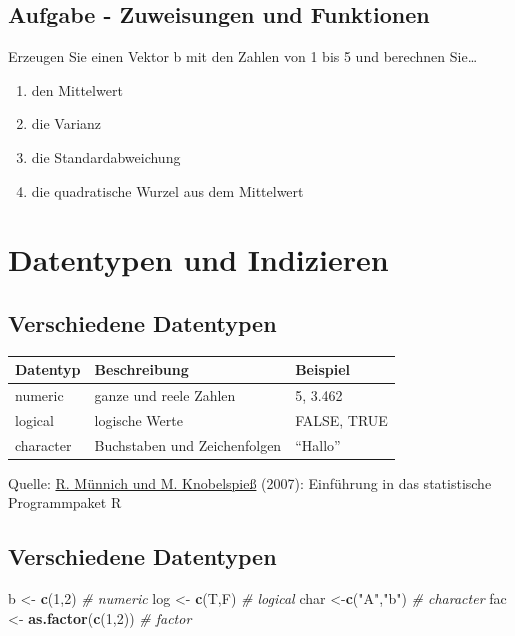 \documentclass[]{article}
\newenvironment{Shaded}{\begin{snugshade}}{\end{snugshade}}
\newcommand{\KeywordTok}[1]{\textcolor[rgb]{0.13,0.29,0.53}{\textbf{{#1}}}}
\newcommand{\DecValTok}[1]{\textcolor[rgb]{0.00,0.00,0.81}{{#1}}}
\newcommand{\StringTok}[1]{\textcolor[rgb]{0.31,0.60,0.02}{{#1}}}
\newcommand{\CommentTok}[1]{\textcolor[rgb]{0.56,0.35,0.01}{\textit{{#1}}}}
\newcommand{\NormalTok}[1]{{#1}}
\begin{document}
\subsection{Aufgabe - Zuweisungen und
Funktionen}\label{aufgabe---zuweisungen-und-funktionen}

Erzeugen Sie einen Vektor b mit den Zahlen von 1 bis 5 und berechnen
Sie\ldots{}

\begin{enumerate}
\def\labelenumi{\arabic{enumi}.}
\item
  den Mittelwert
\item
  die Varianz
\item
  die Standardabweichung
\item
  die quadratische Wurzel aus dem Mittelwert
\end{enumerate}

\section{Datentypen und Indizieren}\label{datentypen-und-indizieren}

\subsection{Verschiedene Datentypen}\label{verschiedene-datentypen}

\begin{longtable}[]{@{}lll@{}}
\toprule
Datentyp & Beschreibung & Beispiel\tabularnewline
\midrule
\endhead
numeric & ganze und reele Zahlen & 5, 3.462\tabularnewline
logical & logische Werte & FALSE, TRUE\tabularnewline
character & Buchstaben und Zeichenfolgen & ``Hallo''\tabularnewline
\bottomrule
\end{longtable}

Quelle:
\href{https://www.uni-trier.de/fileadmin/fb4/prof/VWL/FIN/Oekonometrie/PC-UEbung/Einfuehrung_in_R.pdf}{R.
Münnich und M. Knobelspieß} (2007): Einführung in das statistische
Programmpaket R

\subsection{Verschiedene Datentypen}\label{verschiedene-datentypen-1}

\begin{Shaded}
\begin{Highlighting}[]
\NormalTok{b <-}\StringTok{ }\KeywordTok{c}\NormalTok{(}\DecValTok{1}\NormalTok{,}\DecValTok{2}\NormalTok{) }\CommentTok{# numeric}
\NormalTok{log <-}\StringTok{ }\KeywordTok{c}\NormalTok{(T,F) }\CommentTok{# logical}
\NormalTok{char <-}\KeywordTok{c}\NormalTok{(}\StringTok{"A"}\NormalTok{,}\StringTok{"b"}\NormalTok{) }\CommentTok{# character}
\NormalTok{fac <-}\StringTok{ }\KeywordTok{as.factor}\NormalTok{(}\KeywordTok{c}\NormalTok{(}\DecValTok{1}\NormalTok{,}\DecValTok{2}\NormalTok{)) }\CommentTok{# factor}
\end{Highlighting}
\end{Shaded}
\end{document}
